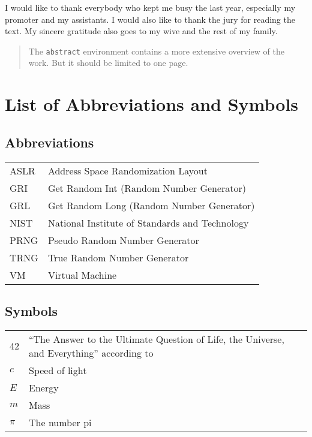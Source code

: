 \documentclass[master=emitm,masteroption=bc,oneside]{kulemt}
\begin{document}
\begin{preface}
  I would like to thank everybody who kept me busy the last year,
  especially my promoter and my assistants. I would also like to thank the
  jury for reading the text. My sincere gratitude also goes to my wive and
  the rest of my family.
\end{preface}



\tableofcontents*

\begin{abstract}
  The \texttt{abstract} environment contains a more extensive overview of
  the work. But it should be limited to one page.

  \lipsum[1]
\end{abstract}

\listoffiguresandtables
\chapter{List of Abbreviations and Symbols}
\section*{Abbreviations}
\begin{flushleft}
  \renewcommand{\arraystretch}{1.1}
  \begin{tabularx}{\textwidth}{@{}p{12mm}X@{}}
    ASLR  & Address Space Randomization Layout \\  	
    GRI   & Get Random Int (Random Number Generator)\\
	GRL	  & Get Random Long (Random Number Generator)\\
    NIST  & National Institute of Standards and Technology \\
    PRNG  & Pseudo Random Number Generator \\    
    TRNG  & True Random Number Generator \\        
    VM	  & Virtual Machine \\
  \end{tabularx}
\end{flushleft}
\section*{Symbols}
\begin{flushleft}
  \renewcommand{\arraystretch}{1.1}
  \begin{tabularx}{\textwidth}{@{}p{12mm}X@{}}
    42    & ``The Answer to the Ultimate Question of Life, the Universe,
            and Everything'' according to \cite{h2g2} \\
    $c$   & Speed of light \\
    $E$   & Energy \\
    $m$   & Mass \\
    $\pi$ & The number pi \\
  \end{tabularx}
\end{flushleft}
\end{document}
